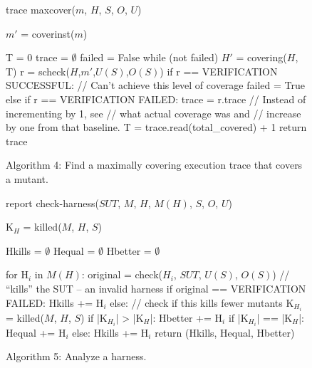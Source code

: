 \documentclass[conference]{IEEEtran}
\begin{document}
\begin{figure}
{\scriptsize 
\begin{code}
trace maxcover($m$, $H$, $S$, $O$, $U$) 
\vspace{0.1in}

$m'$ = coverinst($m$)

T = 0
trace = $\emptyset$
failed = False
while (not failed)
   $H'$ = covering($H$, T)
   r = scheck($H$,$m'$,$U(S)$,$O(S)$)
   if r == VERIFICATION SUCCESSFUL:
     // Can't achieve this level of coverage
     failed = True
   else if r == VERIFICATION FAILED:
     trace = r.trace
     // Instead of incrementing by 1, see
     // what actual coverage was and
     // increase by one from that baseline.
     T = trace.read(total\_covered) + 1
return trace
\end{code}
}
\caption{Algorithm 4: Find a maximally covering execution trace that
  covers a mutant.}
\label{alg:maxcover}
\end{figure}

\begin{figure}
{\scriptsize 
\begin{code}
report check-harness($SUT$, $M$, $H$, $M(H)$, $S$, $O$, $U$) 
\vspace{0.1in}

K$_H$ = killed($M$, $H$, $S$) 

Hkills = $\emptyset$
Hequal = $\emptyset$
Hbetter = $\emptyset$

for H$_i$ in $M(H)$:
   original = check($H_i$, $SUT$, $U(S)$, $O(S)$)
   // ``kills'' the SUT -- an invalid harness
   if original == VERIFICATION FAILED: 
      Hkills += H$_i$
   else: // check if this kills fewer mutants
      K$_{H_i}$ = killed($M$, $H$, $S$)
      if |K$_{H_i}$| > |K$_H$|:
         Hbetter += H$_i$
      if |K$_{H_i}$| == |K$_H$|:
         Hequal += H$_i$
      else:
         Hkills += H$_i$
return (Hkills, Hequal, Hbetter)
\end{code}
}
\caption{Algorithm 5: Analyze a harness.}
\label{alg:checkharness}
\end{figure}
\end{document}
